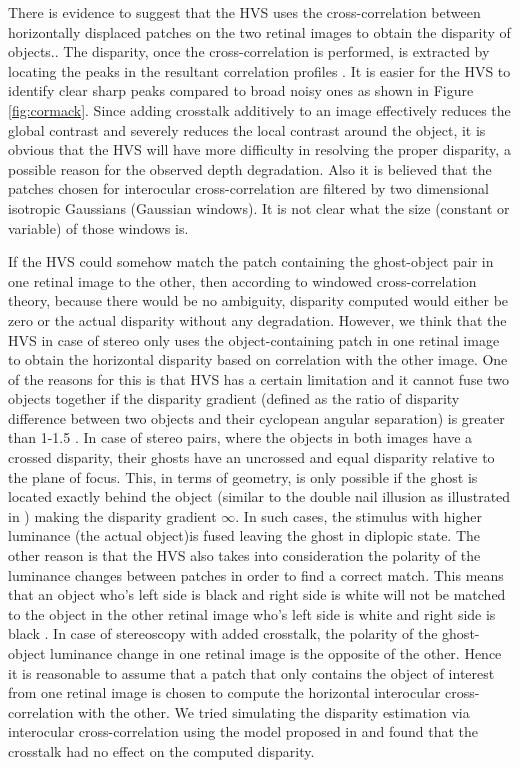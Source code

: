 There is evidence to suggest that the HVS uses the cross-correlation between horizontally displaced patches on the two retinal images to obtain the disparity of objects.\cite{filippini2009limits}\cite{kane2014limits}. The disparity, once the cross-correlation is performed, is extracted by locating the peaks in the resultant correlation profiles \cite{cormack1991interocular}. It is easier for the HVS to identify clear sharp peaks compared to broad noisy ones as shown in Figure \ref{fig:cormack}. Since adding crosstalk additively to an image effectively reduces the global contrast and severely reduces the local contrast around the object, it is obvious that the HVS will have more difficulty in resolving the proper disparity, a possible reason for the observed depth degradation. Also it is believed that the patches chosen for interocular cross-correlation are filtered by two dimensional isotropic Gaussians\cite{filippini2009limits} (Gaussian windows)\cite{filippini2009limits}. It is not clear what the size (constant or variable) of those windows is.

If the HVS could somehow match the patch containing the ghost-object pair in one retinal image to the other, then according to windowed cross-correlation theory, because there would be no ambiguity, disparity computed would either be zero or the actual disparity without any degradation. However, we think that the HVS in case of stereo only uses the object-containing patch in one retinal image to obtain the horizontal disparity based on correlation with the other image. One of the reasons for this is that HVS has a certain limitation and it cannot fuse two objects together if the disparity gradient (defined as the ratio of disparity difference between two objects and their cyclopean angular separation) is greater than 1-1.5 \cite{howard1995binocular} \cite{kane2014limits}. In case of stereo pairs, where the objects in both images have a crossed disparity, their ghosts have an uncrossed and equal disparity relative to the plane of focus. This, in terms of geometry, is only possible if the ghost is located exactly behind the object (similar to the double nail illusion as illustrated in \cite{tsirlin2012effect} \cite{krol1980double}) making the disparity gradient $\infty$. In such cases, the stimulus with higher luminance (the actual object)is fused leaving the ghost in diplopic state. The other reason is that the HVS also takes into consideration the polarity of the luminance changes between patches in order to find a correct match. This means that an object who's left side is black and right side is white will not be matched to the object in the other retinal image who's left side is white and right side is black \cite{howard1995binocular}. In case of stereoscopy with added crosstalk, the polarity of the ghost-object luminance change in one retinal image is the opposite of the other. Hence it is reasonable to assume that a patch that only contains the object of interest from one retinal image is chosen to compute the horizontal interocular cross-correlation with the other. We tried simulating the disparity estimation via interocular cross-correlation using the model proposed in \cite{filippini2009limits} and found that the crosstalk had no effect on the computed disparity.


